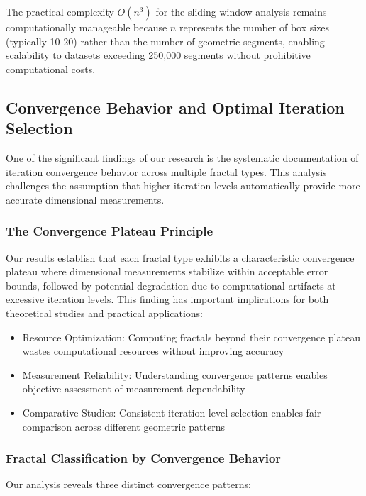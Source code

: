 \documentclass[preprint,12pt]{elsarticle}
\def\textbf#1{#1}%
\begin{document}
The practical complexity $O(n^3)$ for the sliding window analysis remains computationally manageable because $n$ represents the number of box sizes (typically 10-20) rather than the number of geometric segments, enabling scalability to datasets exceeding 250,000 segments without prohibitive computational costs.

\subsection{Convergence Behavior and Optimal Iteration Selection}

One of the significant findings of our research is the systematic documentation of iteration convergence behavior across multiple fractal types. This analysis challenges the assumption that higher iteration levels automatically provide more accurate dimensional measurements.

\subsubsection{The Convergence Plateau Principle}

Our results establish that each fractal type exhibits a characteristic convergence plateau where dimensional measurements stabilize within acceptable error bounds, followed by potential degradation due to computational artifacts at excessive iteration levels. This finding has important implications for both theoretical studies and practical applications:

\begin{itemize}
\item \textbf{Resource Optimization}: Computing fractals beyond their convergence plateau wastes computational resources without improving accuracy
\item \textbf{Measurement Reliability}: Understanding convergence patterns enables objective assessment of measurement dependability
\item \textbf{Comparative Studies}: Consistent iteration level selection enables fair comparison across different geometric patterns
\end{itemize}

\subsubsection{Fractal Classification by Convergence Behavior}

Our analysis reveals three distinct convergence patterns:
\end{document}
